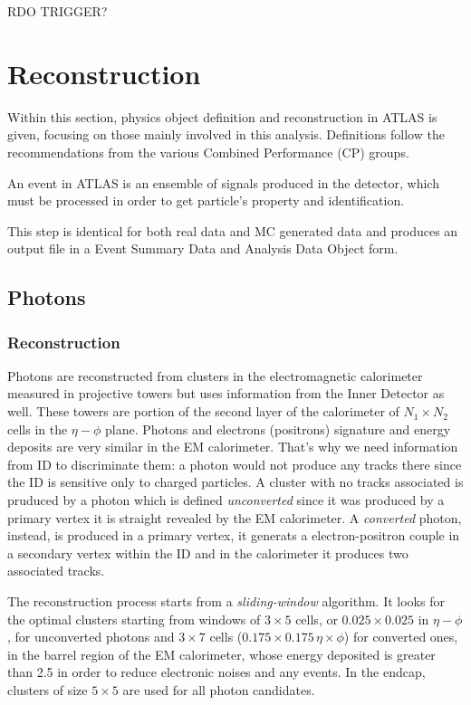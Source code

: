 RDO TRIGGER?

\section{Reconstruction}
\label{sec:recoreal}
Within this section, physics object definition and reconstruction in ATLAS is given, focusing on those mainly involved in this analysis. Definitions follow the recommendations from the various Combined Performance (CP) groups.

An event in ATLAS is an ensemble of signals produced in the detector, which must be processed in order to get particle's property and identification. 

This step is identical for both real data and MC generated data and produces an output file in a Event Summary Data and Analysis Data Object form. 

\subsection{Photons}
\label{photons}
\subsubsection{Reconstruction}
Photons are reconstructed from clusters in the electromagnetic calorimeter measured in projective towers but uses information from the Inner Detector as well. These towers are portion of the second layer of the calorimeter of $N_1 \times N_2$ cells in the $\eta-\phi$ plane. Photons and electrons (positrons) signature and energy deposits are very similar in the EM calorimeter. That's why we need information from ID to discriminate them: a photon would not produce any tracks there since the ID is sensitive only to charged particles. A cluster with no tracks associated is pruduced by a photon which is defined \emph{unconverted} since it was produced by a primary vertex it is straight revealed by the EM calorimeter. A \emph{converted} photon, instead, is produced in a primary vertex, it generats a electron-positron couple in a secondary vertex within the ID and in the calorimeter it produces two associated tracks.

The reconstruction process starts from a \emph{sliding-window} algorithm. It looks for the optimal clusters starting from windows of $3\times5$ cells, or $0.025\times0.025$ in $\eta-\phi$, for unconverted photons and $3\times7$ cells ($0.175\times0.175 \, \eta\times\phi$) for converted ones, in the barrel region of the EM calorimeter, whose energy deposited is greater than \SI{2.5}{\gev} in order to reduce electronic noises and any \pileup events. In the endcap, clusters of size $5\times5$ are used for all photon candidates.

